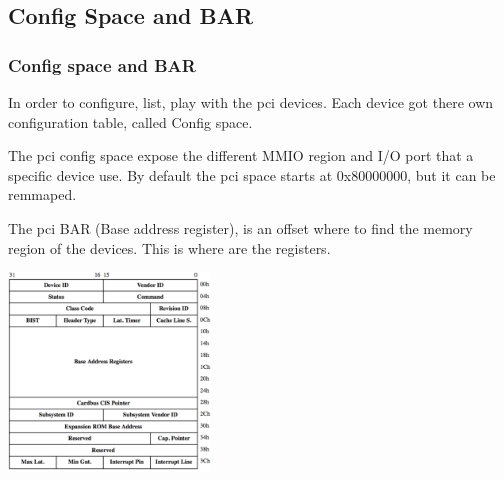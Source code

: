 \subsection{Config Space and BAR}
\begin{frame}
\frametitle{Config space and BAR}
In order to configure, list, play with the pci devices. Each device got
there own configuration table, called Config space.

\-

The pci config space expose the different MMIO region and I/O port that
a specific device use. By default the pci space starts at 0x80000000,
but it can be remmaped.

\-

The pci BAR (Base address register), is an offset where to find the
memory region of the devices. This is where are the registers.

\end{frame}

\begin{frame}
\begin{center}
\includegraphics[height=150pt]{figures/config_space}
\end{center}
\end{frame}

